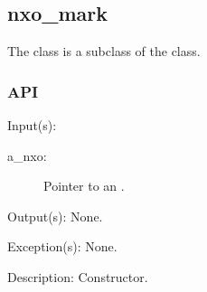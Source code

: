 %
%
%
%
%              

\subsection{nxo\_mark}
\label{nxo_mark}

The  class is a subclass of the  class.

\subsubsection{API}
\begin{capi}
\label{nxo_mark_new}
	\begin{capilist}
	\item[Input(s): ]
		\begin{description}\item[]
		\item[a\_nxo: ]
			Pointer to an .
		\end{description}
	\item[Output(s): ] None.
	\item[Exception(s): ] None.
	\item[Description: ]
		Constructor.
	\end{capilist}
\end{capi}
